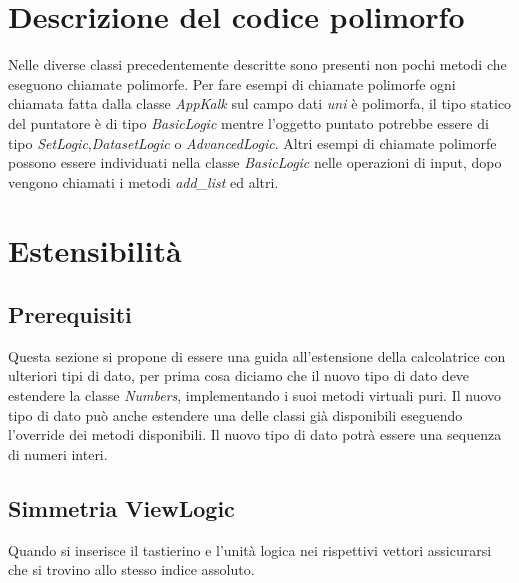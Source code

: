 \documentclass[a4paper,10pt]{article}
\begin{document}
        \section{Descrizione del codice polimorfo}
        Nelle diverse classi precedentemente descritte sono presenti non pochi metodi che eseguono chiamate polimorfe.
        Per fare esempi di chiamate polimorfe ogni chiamata fatta dalla classe \textit{AppKalk} sul campo dati \textit{uni} è polimorfa, il tipo statico del puntatore è di tipo \textit{BasicLogic} mentre l'oggetto puntato potrebbe essere di tipo \textit{SetLogic},\textit{DatasetLogic} o \textit{AdvancedLogic}.
        Altri esempi di chiamate polimorfe possono essere individuati nella classe \textit{BasicLogic} nelle operazioni di input, dopo vengono chiamati i metodi \textit{add\_list} ed altri.

        \section{Estensibilità}
        \subsection{Prerequisiti}
        Questa sezione si propone di essere una guida all'estensione della calcolatrice con ulteriori tipi di dato, per prima cosa diciamo che il nuovo tipo di dato deve estendere la classe \textit{Numbers}, implementando i suoi metodi virtuali puri.
        Il nuovo tipo di dato può anche estendere una delle classi già disponibili eseguendo l'override dei metodi disponibili.
        Il nuovo tipo di dato potrà essere una sequenza di numeri interi.
        \subsection{Simmetria View\-Logic}
        Quando si inserisce il tastierino e l'unità logica nei rispettivi vettori assicurarsi che si trovino allo stesso indice assoluto.
\end{document}
